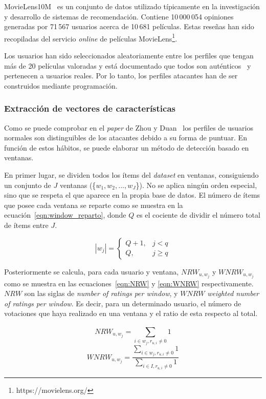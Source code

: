 MovieLens10M~\cite{groupLensDatasets} es un conjunto de datos utilizado típicamente en la investigación y desarrollo de sistemas de recomendación. Contiene 10\,000\,054 opiniones generadas por 71\,567 usuarios acerca de 10\,681 películas. Estas reseñas han sido recopiladas del servicio \textit{online} de películas MovieLens\footnote{https://movielens.org/}.

Los usuarios han sido seleccionados aleatoriamente entre los perfiles que tengan más de 20 películas valoradas y está documentado que todos son auténticos~\cite{zhou2021SemisupervisedRecommendationAttack} y pertenecen a usuarios reales. Por lo tanto, los perfiles atacantes han de ser construidos mediante programación.

\subsubsection{Extracción de vectores de características}

Como se puede comprobar en el \textit{paper} de Zhou y Duan~\cite{zhou2021SemisupervisedRecommendationAttack} los perfiles de usuarios normales son distinguibles de los atacantes debido a su forma de puntuar. En función de estos hábitos, se puede elaborar un método de detección basado en ventanas.

En primer lugar, se dividen todos los ítems del \textit{dataset} en ventanas, consiguiendo un conjunto de $J$ ventanas (\{$w_1, w_2, ..., w_J$\}). No se aplica ningún orden especial, sino que se respeta el que aparece en la propia base de datos. El número de ítems que posee cada ventana se reparte como se muestra en la ecuación~\ref{eqn:window_reparto}, donde $Q$ es el cociente de dividir el número total de ítems entre $J$.
	
\[|w_j| = \left\{ \begin{array}{lr} Q + 1, & j < q\\ Q, & j \ge q \label{eqn:window_reparto} \end{array} \right. \] 

Posteriormente se calcula, para cada usuario y ventana, $NRW_{u, w_j}$ y  $WNRW_{u, w_j}$ como se muestra en las ecuaciones~\ref{eqn:NRW} y \ref{eqn:WNRW} respectivamente. $NRW$ son las siglas de \textit{number of ratings per window}, y $WNRW$ \textit{weighted number of ratings per window}. Es decir, para un determinado usuario, el número de votaciones que haya realizado en una ventana y el ratio de esta respecto al total.

\begin{equation}\label{eqn:NRW} NRW_{u, w_j} = \sum_{i\in w_j, r_{u,i} \ne 0}^{} 1 \end{equation}
\begin{equation}\label{eqn:WNRW} WNRW_{u, w_j} = \frac{\sum_{i\in w_j, r_{u,i} \ne 0}^{} 1}{\sum_{i\in I, r_{u,i} \ne 0}^{} 1} \end{equation}

